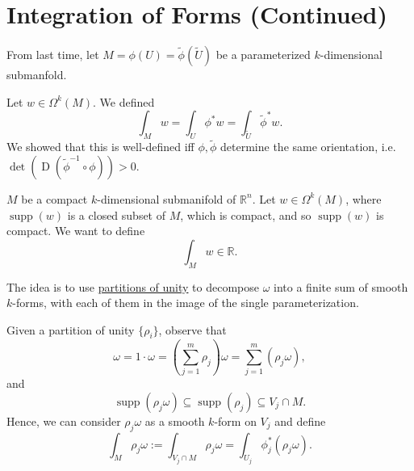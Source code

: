 \documentclass[notoc,notitlepage]{tufte-book}
\DeclareMathOperator{\D}{D}
\DeclareMathOperator{\supp}{supp}
\begin{document}
\section{Integration of Forms (Continued)}%
\label{sec:integration_of_forms_continued}

From last time, let $M = \phi(U) = \tilde{\phi}(\tilde{U})$ be a parameterized
$k$-dimensional submanfold.

Let $w \in \Omega^k(M)$. We defined
\begin{equation*}
  \int_{M} w = \int_{U} \phi^* w = \int_{\tilde{U}} \tilde{\phi}^* w .
\end{equation*}
We showed that this is well-defined iff $\phi, \tilde{\phi}$ determine the same
orientation, i.e. $\det (\D (\tilde{\phi}^{-1} \circ \phi)) > 0$.

 $M$ be a compact $k$-dimensional submanifold of
$\mathbb{R}^n$. Let $w \in \Omega^k(M)$, where $\supp(w)$ is a closed subset of
$M$, which is compact, and so $\supp(w)$ is compact. We want to define
\begin{equation*}
  \int_{M} w \in \mathbb{R}.
\end{equation*}

The idea is to use \hyperref[sec:partitions_of_unity_continued]{partitions of
unity} to decompose $\omega$ into a finite sum of smooth $k$-forms, with each of them
 in the image of the single parameterization.

Given a partition of unity $\{\rho_i\}$, observe that
\begin{equation*}
  \omega = 1 \cdot \omega = \left( \sum_{j=1}^{m} \rho_j \right) \omega =
  \sum_{j=1}^{m} (\rho_j \omega),
\end{equation*}
and
\begin{equation*}
  \supp(\rho_j \omega) \subseteq \supp(\rho_j) \subseteq V_j \cap M.
\end{equation*}
Hence, we can consider $\rho_j \omega$ as a smooth $k$-form on $V_j$ and
define 
\begin{equation*}
  \int_{M} \rho_j \omega := \int_{V_j \cap M} \rho_j \omega = \int_{U_j} \phi_j^* (\rho_j \omega).
\end{equation*}
\end{document}
